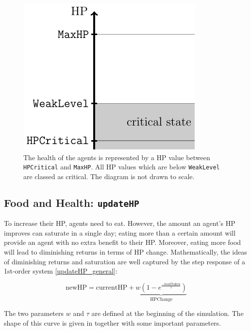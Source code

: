 \begin{figure}[htb]
    \centering
    \includegraphics[width=0.3\linewidth]{002_simulation_structure/images/health_global.pdf}
    \caption{The health of the agents is represented by a HP value between \lstinline$HPCritical$ and \lstinline$MaxHP$. All HP values which are below \lstinline$WeakLevel$ are classed as critical. The diagram is not drawn to scale.}
    \label{fig:health_system}
\end{figure}

\subsection{Food and Health: \texorpdfstring{\lstinline$updateHP$}{updateHP}}\label{updateHP}
To increase their HP, agents need to eat. However, the amount an agent's HP improves can saturate in a single day; eating more than a certain amount will provide an agent with no extra benefit to their HP. Moreover, eating more food will lead to diminishing returns in terms of HP change. Mathematically, the ideas of diminishing returns and saturation are well captured by the step response of a 1st-order system \eqref{updateHP_general}:

\begin{equation}\label{updateHP_general}
   \text{newHP}= \text{currentHP} +\underbrace{w(1-e^{\frac{-\text{foodTaken}}{\tau}})}_{\text{HPChange}}
\end{equation}

The two parameters $w$ and $\tau$ are defined at the beginning of the simulation. The shape of this curve is given in  together with some important parameters.

